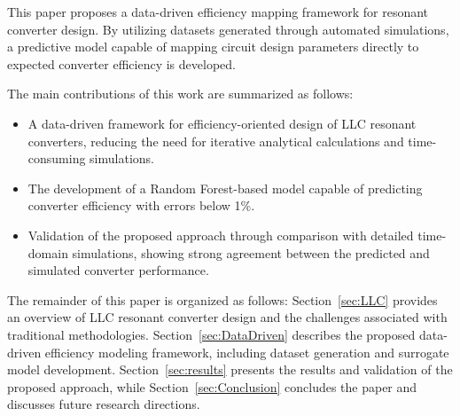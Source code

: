 This paper proposes a data-driven efficiency mapping framework for resonant converter design. By utilizing datasets generated through automated simulations, a predictive model capable of mapping circuit design parameters directly to expected converter efficiency is developed.

The main contributions of this work are summarized as follows:

\begin{itemize}
    \item A data-driven framework for efficiency-oriented design of LLC resonant converters, reducing the need for iterative analytical calculations and time-consuming simulations.
    
    \item The development of a Random Forest-based model capable of predicting converter efficiency with errors below 1\%.
    
    \item Validation of the proposed approach through comparison with detailed time-domain simulations, showing strong agreement between the predicted and simulated converter performance.
\end{itemize}

The remainder of this paper is organized as follows: Section~\ref{sec:LLC} provides an overview of LLC resonant converter design and the challenges associated with traditional methodologies. Section~\ref{sec:DataDriven} describes the proposed data-driven efficiency modeling framework, including dataset generation and surrogate model development. Section~\ref{sec:results} presents the results and validation of the proposed approach, while Section~\ref{sec:Conclusion} concludes the paper and discusses future research directions.